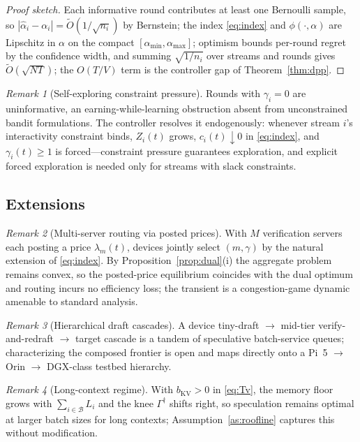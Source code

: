 \documentclass[11pt]{article}
\theoremstyle{definition}
\theoremstyle{remark}
\newtheorem{remark}{Remark}
\newcommand{\cB}{\mathcal{B}}
\begin{document}
\begin{proof}[Proof sketch]
Each informative round contributes at least one Bernoulli sample, so
$|\hat{\alpha}_i-\alpha_i|=\widetilde{O}(1/\sqrt{n_i})$ by Bernstein; the
index \eqref{eq:index} and $\phi(\cdot,\alpha)$ are Lipschitz in $\alpha$ on
the compact $[\alpha_{\min},\alpha_{\max}]$; optimism bounds per-round regret
by the confidence width, and summing $\sqrt{1/n_i}$ over streams and rounds
gives $\widetilde{O}(\sqrt{NT})$; the $O(T/V)$ term is the controller gap of
Theorem~\ref{thm:dpp}.
\end{proof}

\begin{remark}[Self-exploring constraint pressure]\label{rem:explore}
Rounds with $\gamma_i=0$ are uninformative, an earning-while-learning
obstruction absent from unconstrained bandit formulations. The controller
resolves it endogenously: whenever stream $i$'s interactivity constraint
binds, $Z_i(t)$ grows, $c_i(t)\downarrow0$ in \eqref{eq:index}, and
$\gamma_i(t)\ge1$ is forced---constraint pressure guarantees exploration, and
explicit forced exploration is needed only for streams with slack
constraints.
\end{remark}

\subsection{Extensions}\label{ssec:extensions}

\begin{remark}[Multi-server routing via posted prices]
With $M$ verification servers each posting a price $\lambda_m(t)$, devices
jointly select $(m,\gamma)$ by the natural extension of \eqref{eq:index}. By
Proposition~\ref{prop:dual}(i) the aggregate problem remains convex, so the
posted-price equilibrium coincides with the dual optimum and routing incurs
no efficiency loss; the transient is a congestion-game dynamic amenable to
standard analysis.
\end{remark}

\begin{remark}[Hierarchical draft cascades]
A device tiny-draft $\to$ mid-tier verify-and-redraft $\to$ target cascade is
a tandem of speculative batch-service queues; characterizing the composed
frontier is open and maps directly onto a Pi~5 $\to$ Orin $\to$ DGX-class
testbed hierarchy.
\end{remark}

\begin{remark}[Long-context regime]
With $b_{\mathrm{KV}}>0$ in \eqref{eq:Tv}, the memory floor grows with
$\sum_{i\in\cB}L_i$ and the knee $\Gamma^{\dagger}$ shifts right, so
speculation remains optimal at larger batch sizes for long contexts;
Assumption~\ref{as:roofline} captures this without modification.
\end{remark}
\end{document}
